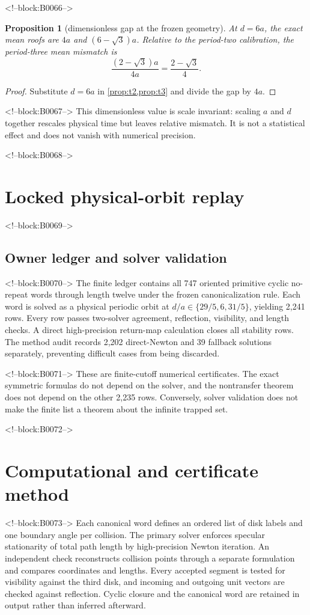 \documentclass[11pt,a4paper]{article}
\newtheorem{proposition}[theorem]{Proposition}
\theoremstyle{definition}
\theoremstyle{remark}
\begin{document}
<!--block:B0066-->
\begin{proposition}[dimensionless gap at the frozen geometry]
At \(d=6a\), the exact mean roofs are \(4a\) and \((6-\sqrt3)a\). Relative to the period-two calibration, the period-three mean mismatch is
\[
 \frac{(2-\sqrt3)a}{4a}=\frac{2-\sqrt3}{4}.
\]
\end{proposition}
\begin{proof}
Substitute \(d=6a\) in \cref{prop:t2,prop:t3} and divide the gap by \(4a\).
\end{proof}

<!--block:B0067-->
This dimensionless value is scale invariant: scaling \(a\) and \(d\) together rescales physical time but leaves relative mismatch. It is not a statistical effect and does not vanish with numerical precision.

<!--block:B0068-->
\section{Locked physical-orbit replay}

<!--block:B0069-->
\subsection{Owner ledger and solver validation}

<!--block:B0070-->
The finite ledger contains all 747 oriented primitive cyclic no-repeat words through length twelve under the frozen canonicalization rule. Each word is solved as a physical periodic orbit at \(d/a\in\{29/5,6,31/5\}\), yielding 2,241 rows. Every row passes two-solver agreement, reflection, visibility, and length checks. A direct high-precision return-map calculation closes all stability rows. The method audit records 2,202 direct-Newton and 39 fallback solutions separately, preventing difficult cases from being discarded.

<!--block:B0071-->
These are finite-cutoff numerical certificates. The exact symmetric formulas do not depend on the solver, and the nontransfer theorem does not depend on the other 2,235 rows. Conversely, solver validation does not make the finite list a theorem about the infinite trapped set.

<!--block:B0072-->
\section{Computational and certificate method}

<!--block:B0073-->
Each canonical word defines an ordered list of disk labels and one boundary angle per collision. The primary solver enforces specular stationarity of total path length by high-precision Newton iteration. An independent check reconstructs collision points through a separate formulation and compares coordinates and lengths. Every accepted segment is tested for visibility against the third disk, and incoming and outgoing unit vectors are checked against reflection. Cyclic closure and the canonical word are retained in output rather than inferred afterward.
\end{document}
